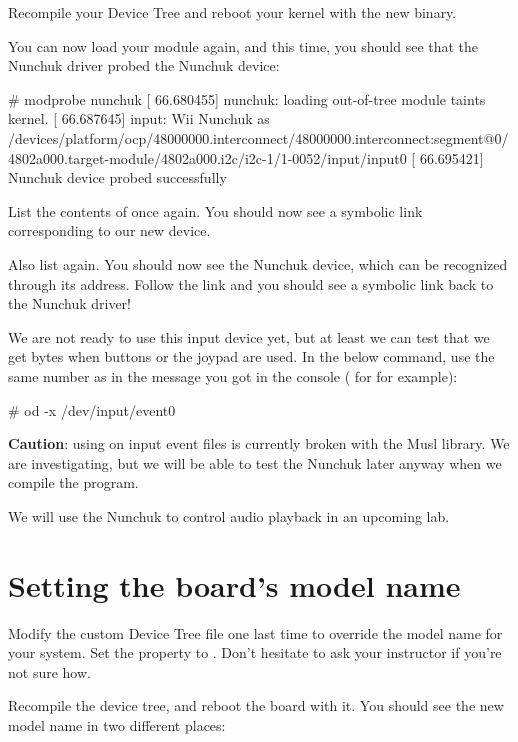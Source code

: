{Recompile your Device Tree and reboot your kernel with the new binary.

You can now load your module again, and this time, you should see that
the Nunchuk driver probed the Nunchuk device:

\begin{bashinput}
# modprobe nunchuk
[   66.680455] nunchuk: loading out-of-tree module taints kernel.
[   66.687645] input: Wii Nunchuk as /devices/platform/ocp/48000000.interconnect/48000000.interconnect:segment@0/4802a000.target-module/4802a000.i2c/i2c-1/1-0052/input/input0
[   66.695421] Nunchuk device probed successfully
\end{bashinput}

List the contents of  once again. You
should now see a symbolic link corresponding to our new device.

Also list  again. You should now see the
Nunchuk device, which can be recognized through its  address.
Follow the link and you should see a symbolic link back to the Nunchuk
driver!

We are not ready to use this input device yet, but at least we can test
that we get bytes when buttons or the joypad are used. In the below
command, use the same number as in the message you got in the console
( for  for example):

\begin{bashinput}
# od -x /dev/input/event0
\end{bashinput}

{\bf Caution}: using  on input event files is currently broken
with the Musl library. We are investigating, but we will be able
to test the Nunchuk later anyway when we compile the 
program.

We will use the Nunchuk to control audio playback in an upcoming lab.

\section{Setting the board's model name}

Modify the custom Device Tree file one last time to override the model
name for your system. Set the  property to
. Don't hesitate to ask your
instructor if you're not sure how.

Recompile the device tree, and reboot the board with it. You should see
the new model name in two different places:

}
